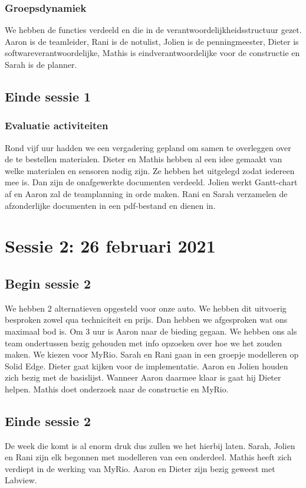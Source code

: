 \documentclass[a4paper,twoside,kulak]{kulakreport} %
\begin{document}
\subsection{Groepsdynamiek}
We hebben de functies verdeeld en die in de verantwoordelijkheidsstructuur gezet. Aaron is de teamleider, Rani is de notulist, Jolien is de penningmeester, Dieter is softwareverantwoordelijke, Mathis is eindverantwoordelijke voor de constructie en Sarah is de planner. 
\section{Einde sessie 1}
\subsection{Evaluatie activiteiten}
Rond vijf uur hadden we een vergadering gepland om samen te overleggen over de te bestellen materialen. Dieter en Mathis hebben al een idee gemaakt van welke materialen en sensoren nodig zijn. Ze hebben het uitgelegd zodat iedereen mee is. Dan zijn de onafgewerkte documenten verdeeld. Jolien werkt Gantt-chart af en Aaron zal de teamplanning in orde maken. Rani en Sarah verzamelen de afzonderlijke documenten in een pdf-bestand en dienen in.



\chapter{Sessie 2: 26 februari 2021}
\section{Begin sessie 2}
We hebben 2 alternatieven opgesteld voor onze auto. We hebben dit uitvoerig besproken zowel qua techniciteit en prijs. Dan hebben we afgesproken wat ons maximaal bod is. Om 3 uur is Aaron naar de bieding gegaan. We hebben ons als team ondertussen bezig gehouden met info opzoeken over hoe we het zouden maken. We kiezen voor MyRio. Sarah en Rani gaan in een groepje modelleren op Solid Edge. Dieter gaat kijken voor de implementatie. Aaron en Jolien houden zich bezig met de basislijst. Wanneer Aaron daarmee klaar is gaat hij Dieter helpen. Mathis doet onderzoek naar de constructie en MyRio.
\section{Einde sessie 2}
De week die komt is al enorm druk dus zullen we het hierbij laten. Sarah, Jolien en Rani zijn elk begonnen met modelleren van een onderdeel. Mathis heeft zich verdiept in de werking van MyRio. Aaron en Dieter zijn bezig geweest met Labview.
\end{document}
